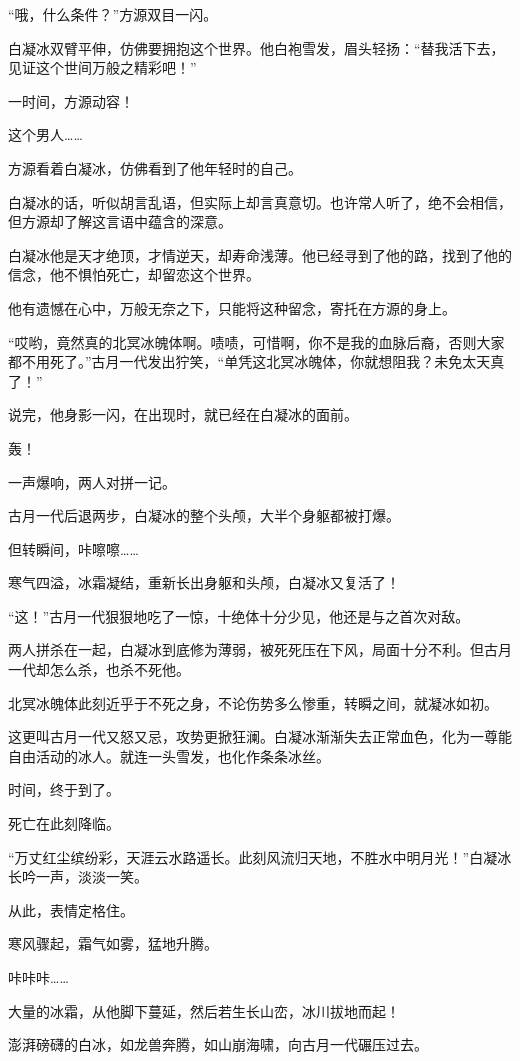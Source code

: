 \begin{this_body}
“哦，什么条件？”方源双目一闪。

白凝冰双臂平伸，仿佛要拥抱这个世界。他白袍雪发，眉头轻扬：“替我活下去，见证这个世间万般之精彩吧！”

一时间，方源动容！

这个男人……

方源看着白凝冰，仿佛看到了他年轻时的自己。

白凝冰的话，听似胡言乱语，但实际上却言真意切。也许常人听了，绝不会相信，但方源却了解这言语中蕴含的深意。

白凝冰他是天才绝顶，才情逆天，却寿命浅薄。他已经寻到了他的路，找到了他的信念，他不惧怕死亡，却留恋这个世界。

他有遗憾在心中，万般无奈之下，只能将这种留念，寄托在方源的身上。

“哎哟，竟然真的北冥冰魄体啊。啧啧，可惜啊，你不是我的血脉后裔，否则大家都不用死了。”古月一代发出狞笑，“单凭这北冥冰魄体，你就想阻我？未免太天真了！”

说完，他身影一闪，在出现时，就已经在白凝冰的面前。

轰！

一声爆响，两人对拼一记。

古月一代后退两步，白凝冰的整个头颅，大半个身躯都被打爆。

但转瞬间，咔嚓嚓……

寒气四溢，冰霜凝结，重新长出身躯和头颅，白凝冰又复活了！

“这！”古月一代狠狠地吃了一惊，十绝体十分少见，他还是与之首次对敌。

两人拼杀在一起，白凝冰到底修为薄弱，被死死压在下风，局面十分不利。但古月一代却怎么杀，也杀不死他。

北冥冰魄体此刻近乎于不死之身，不论伤势多么惨重，转瞬之间，就凝冰如初。

这更叫古月一代又怒又忌，攻势更掀狂澜。白凝冰渐渐失去正常血色，化为一尊能自由活动的冰人。就连一头雪发，也化作条条冰丝。

时间，终于到了。

死亡在此刻降临。

“万丈红尘缤纷彩，天涯云水路遥长。此刻风流归天地，不胜水中明月光！”白凝冰长吟一声，淡淡一笑。

从此，表情定格住。

寒风骤起，霜气如雾，猛地升腾。

咔咔咔……

大量的冰霜，从他脚下蔓延，然后若生长山峦，冰川拔地而起！

澎湃磅礴的白冰，如龙兽奔腾，如山崩海啸，向古月一代碾压过去。


\end{this_body}

